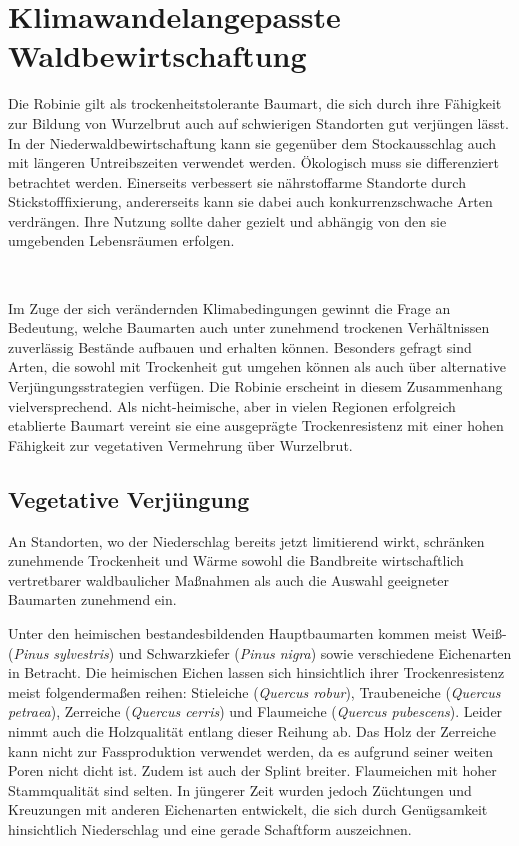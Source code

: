 \documentclass[twocolumn]{scrartcl}
\makeatletter
\newcommand{\summary}[1]{%
  \par %
  {\small\sffamily
    \noindent #1\par}
  \vspace{-0.4em}
  \noindent\makebox[\linewidth]{\rule{0.33\linewidth}{0.4pt}}\\[-1.2em]
  \@afterindentfalse\@afterheading
}
\makeatother
\begin{document}
\section{Klimawandelangepasste Waldbewirtschaftung}

\summary{Die Robinie gilt als trockenheitstolerante Baumart, die sich
  durch ihre Fähigkeit zur Bildung von Wurzelbrut auch auf schwierigen
  Standorten gut verjüngen lässt. In der Niederwaldbewirtschaftung
  kann sie gegenüber dem Stockausschlag auch mit längeren
  Untreibszeiten verwendet werden. Ökologisch muss sie differenziert
  betrachtet werden. Einerseits verbessert sie nährstoffarme Standorte
  durch Stickstofffixierung, andererseits kann sie dabei auch
  konkurrenzschwache Arten verdrängen. Ihre Nutzung sollte daher
  gezielt und abhängig von den sie umgebenden Lebensräumen erfolgen.}

Im Zuge der sich verändernden Klimabedingungen gewinnt die Frage an
Bedeutung, welche Baumarten auch unter zunehmend trockenen
Verhältnissen zuverlässig Bestände aufbauen und erhalten
können. Besonders gefragt sind Arten, die sowohl mit Trockenheit gut
umgehen können als auch über alternative Verjüngungsstrategien
verfügen. Die Robinie erscheint in diesem Zusammenhang
vielversprechend. Als nicht-heimische, aber in vielen Regionen
erfolgreich etablierte Baumart vereint sie eine ausgeprägte
Trockenresistenz mit einer hohen Fähigkeit zur vegetativen Vermehrung
über Wurzelbrut.

\subsection{Vegetative Verjüngung}

An Standorten, wo der Niederschlag bereits jetzt limitierend wirkt,
schränken zunehmende Trockenheit und Wärme sowohl die Bandbreite
wirtschaftlich vertretbarer waldbaulicher Maßnahmen als auch die
Auswahl geeigneter Baumarten zunehmend ein.

Unter den heimischen bestandesbildenden Hauptbaumarten kommen meist
Weiß- (\emph{Pinus sylvestris}) und Schwarzkiefer (\emph{Pinus nigra})
sowie verschiedene Eichenarten in Betracht. Die heimischen Eichen
lassen sich hinsichtlich ihrer Trockenresistenz meist folgendermaßen
reihen: Stieleiche (\emph{Quercus robur}), Traubeneiche (\emph{Quercus
petraea}), Zerreiche (\emph{Quercus cerris}) und Flaumeiche
(\emph{Quercus pubescens}). Leider nimmt auch die Holzqualität entlang
dieser Reihung ab. Das Holz der Zerreiche kann nicht zur
Fassproduktion verwendet werden, da es aufgrund seiner weiten Poren
nicht dicht ist. Zudem ist auch der Splint breiter. Flaumeichen mit
hoher Stammqualität sind selten. In jüngerer Zeit wurden jedoch
Züchtungen und Kreuzungen mit anderen Eichenarten entwickelt, die sich
durch Genügsamkeit hinsichtlich Niederschlag und eine gerade
Schaftform auszeichnen.
\end{document}
